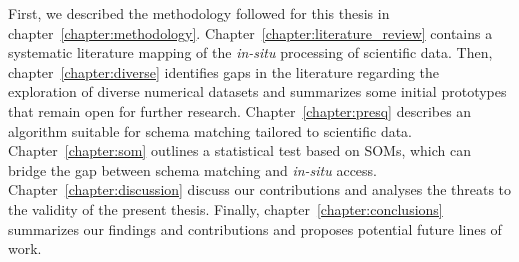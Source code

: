 First, we described the methodology followed for this thesis in chapter~\ref{chapter:methodology}.
Chapter~\ref{chapter:literature_review} contains a systematic literature mapping
of the \emph{in-situ} processing of scientific data.
Then, chapter~\ref{chapter:diverse} identifies gaps in the literature regarding
the exploration of diverse numerical datasets and summarizes some initial prototypes
that remain open for further research.
Chapter~\ref{chapter:presq} describes an algorithm suitable for schema matching
tailored to scientific data. Chapter~\ref{chapter:som} outlines a statistical
test based on \glspl{SOM}, which can bridge the gap between schema matching and
\emph{in-situ} access.
Chapter~\ref{chapter:discussion} discuss our contributions
and analyses the threats to the validity of the present thesis.
Finally, chapter~\ref{chapter:conclusions} summarizes our findings and contributions and proposes potential future lines of work.
